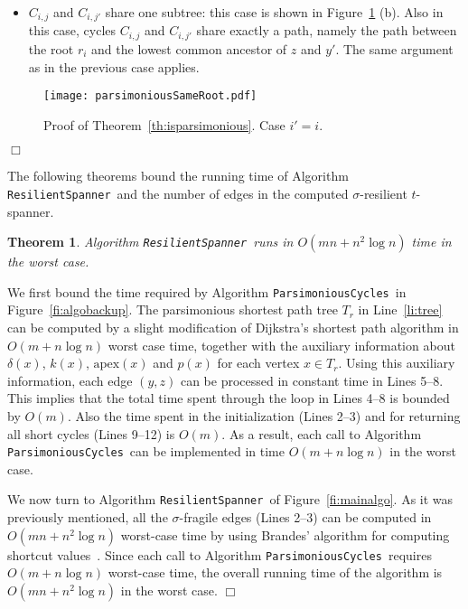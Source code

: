 \documentclass{article}
\newcommand{\apex}          {\mathrm{apex}}
\newtheorem{theorem}{Theorem}
\newcommand{\qed}{\hfill \ensuremath{\Box}}
\newenvironment{proof}{\vspace{1ex}\noindent{\bf Proof.}\hspace{0.5em}}
	{\hfill\qed\vspace{2ex}}
\newcommand{\ResilientSpanner}{\texttt{ResilientSpanner}}
\newcommand{\ParsimoniousCycles}{\texttt{ParsimoniousCycles}}
\begin{document}
\begin{proof}
\begin{description}
\begin{itemize}
\item{$C_{i,j}$ and $C_{i,j'}$ share one subtree:} this case is shown in Figure~\ref{fi:parsimoniousSameRoot} (b). Also in this case, cycles $C_{i,j}$ and $C_{i,j'}$ share exactly a path, namely the path between the root $r_i$ and the lowest common ancestor of $z$ and $y'$. The same argument as in the previous case applies. 
\end{itemize}

\end{description}

\begin{figure}[t]
\begin{center}
\texttt{[image: parsimoniousSameRoot.pdf]}
\end{center}
\caption{Proof of Theorem~\ref{th:isparsimonious}. Case $i' = i$.}\protect\label{fi:parsimoniousSameRoot}
\end{figure}


\end{proof}

The following theorems bound the running time of Algorithm \ResilientSpanner\ and the number of edges in the computed $\sigma$-resilient $t$-spanner.

\begin{theorem}\label{th:shvalpreservingbis}
Algorithm \ResilientSpanner\ runs in $O(mn + n^2 \log n)$ time in the worst case.
\end{theorem}
\begin{proof}
We first bound the time required by Algorithm \ParsimoniousCycles\ in Figure~\ref{fi:algobackup}. 
The parsimonious shortest path tree $T_r$ in Line~\ref{li:tree} can be computed by a slight modification of Dijkstra's shortest path algorithm in $O(m + n \log n)$ worst case time, together with the auxiliary information about 
 $\delta(x)$, $k(x)$, $\apex(x)$ and $p(x)$ for each vertex $x\in T_r$. Using this auxiliary information, each edge $(y,z)$ can be processed in constant time in Lines 5--8. This implies that the total time spent through the loop in Lines 4--8 is bounded by $O(m)$.
Also the time spent in the initialization (Lines 2--3) and for returning all short cycles (Lines 9--12) is $O(m)$. As a result, each call to 
Algorithm \ParsimoniousCycles\ can be implemented in time $O(m+n\log n)$ in the worst case.

We now turn to Algorithm \ResilientSpanner\ of Figure~\ref{fi:mainalgo}. As it was previously mentioned, 
all the $\sigma$-fragile edges (Lines 2--3) can be computed in $O(m n + n^2 \log n)$ worst-case time by using Brandes' algorithm for computing shortcut values~\cite{Dagstuhl4}. 
Since each call to Algorithm \ParsimoniousCycles\  requires $O(m + n \log n)$ worst-case time, the overall running time of the algorithm is $O(mn + n^2 \log n)$ in the worst case.
\end{proof}
\end{document}
